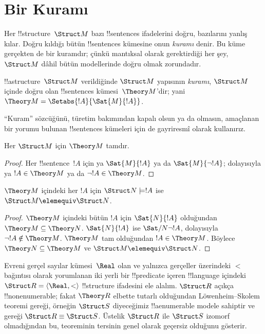 \documentclass[../../../include/open-logic-section]{subfiles}
\begin{document}

\section{Bir  Kuramı}

Her !!{structure}~$\Struct M$ bazı !!{sentence}s ifadelerini doğru,
bazılarını yanlış kılar. Doğru kıldığı bütün !!{sentence}s kümesine
onun \emph{kuramı} denir. Bu küme gerçekten de bir kuramdır; çünkü
mantıksal olarak gerektirdiği her şey, $\Struct M$ dâhil bütün
modellerinde doğru olmak zorundadır.

\begin{defn}
  !!a{structure}~$\Struct M$ verildiğinde $\Struct M$ yapısının
  \emph{kuramı}, $\Struct M$ içinde doğru olan !!{sentence}s
  kümesi~$\Theory M$'dir; yani
  $\Theory M=\Setabs{!A}{\Sat{M}{!A}}$.
\end{defn}

``Kuram'' sözcüğünü, türetim bakımından kapalı olsun ya da olmasın,
amaçlanan bir yorumu bulunan !!{sentence}s kümeleri için de gayriresmî
olarak kullanırız.

\begin{prop}
Her $\Struct M$ için $\Theory M$ tamdır.
\end{prop}

\begin{proof}
Her !!{sentence}~$!A$ için ya $\Sat{M}{!A}$ ya da
$\Sat{M}{\lnot !A}$; dolayısıyla ya $!A\in\Theory M$ ya da
$\lnot !A\in\Theory M$.
\end{proof}

\begin{prop}
  $\Theory M$ içindeki her $!A$ için $\Struct N\models !A$ ise
  $\Struct M\elemequiv\Struct N$.
\end{prop}

\begin{proof}
$\Theory M$ içindeki bütün $!A$ için $\Sat{N}{!A}$ olduğundan
$\Theory M\subseteq\Theory N$. $\Sat{N}{!A}$ ise
$\Sat/{N}{\lnot !A}$, dolayısıyla $\lnot !A\notin\Theory M$.
$\Theory M$ tam olduğundan $!A\in\Theory M$. Böylece
$\Theory N\subseteq\Theory M$ ve $\Struct M\elemequiv\Struct N$.
\end{proof}

\begin{rem}
  Evreni gerçel sayılar kümesi~$\Real$ olan ve yalnızca gerçeller
  üzerindeki $<$ bağıntısı olarak yorumlanan iki yerli bir
  !!{predicate} içeren !!{language} içindeki
  $\Struct R=\langle\Real,<\rangle$ !!{structure} ifadesini ele alalım.
  $\Struct R$ açıkça !!{nonenumerable}; fakat $\Theory R$ elbette
  tutarlı olduğundan Löwenheim--Skolem teoremi gereği, örneğin
  $\Struct S$ diyeceğimiz !!a{enumerable} modele sahiptir ve
   gereği $\Struct R\equiv\Struct S$. Üstelik
  $\Struct R$ ile $\Struct S$ izomorf olmadığından bu,
   teoreminin tersinin genel olarak geçersiz
  olduğunu gösterir.
\end{rem}
\end{document}
